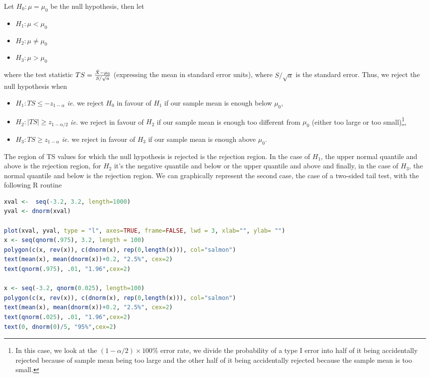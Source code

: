 \documentclass{homework}
\begin{document}
\begin{tcolorbox}[title=Rules for a normal Z-test]

Let $H_0 : \mu = \mu_0$ be the null hypothesis, then let 
\begin{itemize}
    \item $H_1: \mu < \mu_0$
    \item $H_2: \mu \neq \mu_0$
    \item $H_3: \mu > \mu_0$
\end{itemize}

where the test statistic $TS = \frac{\Bar{X}-\mu_0}{S/\sqrt{a}}$ (expressing the mean in standard error units), where $S/\sqrt{a}$ is the standard error. Thus, we reject the null hypothesis when 

\begin{itemize}
    \item $H_1: TS \leq -z_{1-\alpha}$ \textit{ie.} we reject $H_0$ in favour of $H_1$ if our sample mean is enough below $\mu_0$,
    \item $H_2: |TS| \geq  z_{1-\alpha/2}$ \textit{ie.} we reject in favour of $H_2$ if our sample mean is enough too different from $\mu_0$ (either too large or too small)\footnote{In this case, we look at the $(1-\alpha/2)\times 100\%$ error rate, we divide the probability of a type I error into half of it being accidentally rejected because of sample mean being too large and the other half of it being accidentally rejected because the sample mean is too small. }, 
    \item $H_3: TS \geq z_{1-\alpha}$ \textit{ie.} we reject in favour of $H_3$ if our sample mean is enough above $\mu_0$.
\end{itemize}
\end{tcolorbox}

The region of TS values for which the null hypothesis is rejected is the rejection region. In the case of $H_1$, the upper normal quantile and above is the rejection region, for $H_2$ it's the negative quantile and below or the upper quantile and above and finally, in the case of $H_3$, the normal quantile and below is the rejection region. We can graphically represent the second case, the case of a two-sided tail test, with the following R routine

\begin{lstlisting}[language=R]
xval <-  seq(-3.2, 3.2, length=1000)
yval <- dnorm(xval)

plot(xval, yval, type = "l", axes=TRUE, frame=FALSE, lwd = 3, xlab="", ylab= "")
x <- seq(qnorm(.975), 3.2, length = 100)
polygon(c(x, rev(x)), c(dnorm(x), rep(0,length(x))), col="salmon")
text(mean(x), mean(dnorm(x))+0.2, "2.5%", cex=2)
text(qnorm(.975), .01, "1.96",cex=2)

x <- seq(-3.2, qnorm(0.025), length=100)
polygon(c(x, rev(x)), c(dnorm(x), rep(0,length(x))), col="salmon")
text(mean(x), mean(dnorm(x))+0.2, "2.5%", cex=2)
text(qnorm(.025), .01, "1.96",cex=2)
text(0, dnorm(0)/5, "95%",cex=2)
\end{lstlisting}
\end{document}
